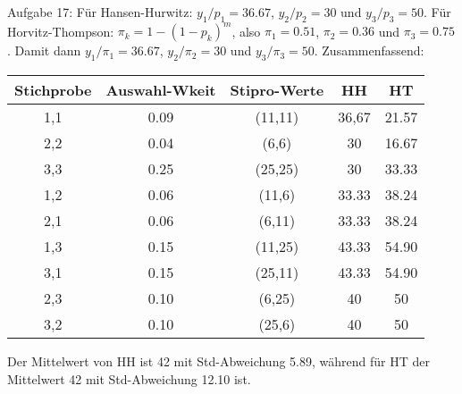 \begin{Solution}{{Aufgabe 17:}}
Für Hansen-Hurwitz: $y_1/p_1 = 36.67$, $y_2/p_2 = 30$ und $y_3/p_3 = 50$. Für Horvitz-Thompson: $\pi_k = 1-(1-p_k)^m$, also $\pi_1 = 0.51$, $\pi_2=0.36$ und $\pi_3 = 0.75$. Damit dann $y_1/\pi_1 = 36.67$, $y_2/\pi_2 = 30$ und $y_3/\pi_3 = 50$. Zusammenfassend:
	\begin{center}
\begin{tabular}{|c|c|c|c|c|}
	\hline
	Stichprobe & Auswahl-Wkeit & Stipro-Werte & HH & HT \\
	\hline
	1,1 & 0.09 & (11,11) & 36,67 & 21.57 \\
	\hline
	2,2 & 0.04 & (6,6) & 30 & 16.67 \\
	\hline
	3,3 & 0.25 & (25,25) & 30 & 33.33 \\
	\hline
	1,2 & 0.06 & (11,6) & 33.33 & 38.24 \\
	\hline
	2,1 & 0.06 & (6,11) & 33.33 & 38.24 \\
	\hline
	1,3 & 0.15 & (11,25) & 43.33 & 54.90 \\
	\hline
	3,1 & 0.15 & (25,11) & 43.33 & 54.90 \\
	\hline
	2,3 & 0.10 & (6,25) & 40 & 50 \\
	\hline
	3,2 & 0.10 & (25,6) & 40 & 50 \\
	\hline
\end{tabular}
\end{center}
Der Mittelwert von HH ist 42 mit Std-Abweichung 5.89, während für HT der Mittelwert 42 mit Std-Abweichung 12.10 ist.
\end{Solution}
